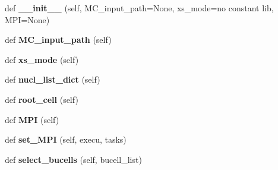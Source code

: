 \begin{DoxyCompactItemize}
\item 
\mbox{\label{classonix_1_1couple_1_1couple__openmc_1_1Couple__openmc_a70f9ae472b9c739c945341f5cf7e1065}} 
def {\bfseries \+\_\+\+\_\+init\+\_\+\+\_\+} (self, M\+C\+\_\+input\+\_\+path=None, xs\+\_\+mode=\textquotesingle{}no constant lib\textquotesingle{}, M\+PI=None)
\item 
\mbox{\label{classonix_1_1couple_1_1couple__openmc_1_1Couple__openmc_a1ddba61010788d4d482920f9c7cd1392}} 
def {\bfseries M\+C\+\_\+input\+\_\+path} (self)
\item 
\mbox{\label{classonix_1_1couple_1_1couple__openmc_1_1Couple__openmc_a0e02086e08c43d478ff9c7d08ee6f89f}} 
def {\bfseries xs\+\_\+mode} (self)
\item 
\mbox{\label{classonix_1_1couple_1_1couple__openmc_1_1Couple__openmc_a2a2b2b904ef4e7d9fa55d971c822e3f5}} 
def {\bfseries nucl\+\_\+list\+\_\+dict} (self)
\item 
\mbox{\label{classonix_1_1couple_1_1couple__openmc_1_1Couple__openmc_adc2c812a2bc782ccfbba66ea4adb9801}} 
def {\bfseries root\+\_\+cell} (self)
\item 
\mbox{\label{classonix_1_1couple_1_1couple__openmc_1_1Couple__openmc_a0f6b81d39069a73d5f4a3e2f546a5dba}} 
def {\bfseries M\+PI} (self)
\item 
\mbox{\label{classonix_1_1couple_1_1couple__openmc_1_1Couple__openmc_a9364a27dd37e0804e2db18a98e6b2090}} 
def {\bfseries set\+\_\+\+M\+PI} (self, execu, tasks)
\item 
\mbox{\label{classonix_1_1couple_1_1couple__openmc_1_1Couple__openmc_a898f1cdf7b334e0db5610c1ff130c0fd}} 
def {\bfseries select\+\_\+bucells} (self, bucell\+\_\+list)
\item 

\end{DoxyCompactItemize}
